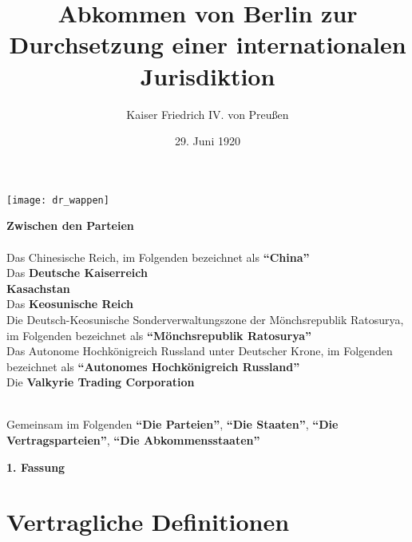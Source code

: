 \documentclass{article}
\title{Abkommen von Berlin zur Durchsetzung einer internationalen Jurisdiktion}
\author{Kaiser Friedrich IV. von Preußen}
\date{29. Juni 1920}
\begin{document}
\maketitle
\begin{center}
    \texttt{[image: dr\_wappen]}
\end{center}
\begin{center}
    \textbf{Zwischen den Parteien\\}\textbf{\\}
    Das Chinesische Reich, im Folgenden bezeichnet als \textbf{``China''\\}
    Das \textbf{Deutsche Kaiserreich\\}
    \textbf{Kasachstan\\}
    Das \textbf{Keosunische Reich\\}
    Die Deutsch-Keosunische Sonderverwaltungszone der Mönchsrepublik Ratosurya, im Folgenden bezeichnet als \textbf{``Mönchsrepublik Ratosurya''\\}
    Das Autonome Hochkönigreich Russland unter Deutscher Krone, im Folgenden bezeichnet als \textbf{``Autonomes Hochkönigreich Russland''\\}
    Die \textbf{Valkyrie Trading Corporation\\}
    \textbf{\\}

    Gemeinsam im Folgenden \textbf{``Die Parteien''}, \textbf{``Die Staaten''}, \textbf{``Die Vertragsparteien''}, \textbf{``Die Abkommensstaaten''}
\end{center}
\newpage
{}
\vspace*{\fill}
\begin{Center}
\textbf{1. Fassung}
\vspace*{\fill}
\end{Center}
\newpage
\tableofcontents
\newpage
\section{Vertragliche Definitionen}
\end{document}
